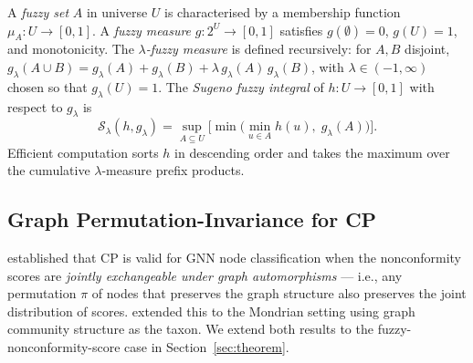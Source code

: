 A \emph{fuzzy set} $A$ in universe $U$ is characterised by a membership
function $\mu_A : U \to [0,1]$.
A \emph{fuzzy measure} $g : 2^U \to [0,1]$ satisfies $g(\emptyset)=0$,
$g(U)=1$, and monotonicity.
The \emph{$\lambda$-fuzzy measure} \citep{sugeno74} is defined recursively:
for $A, B$ disjoint,
$g_\lambda(A \cup B) = g_\lambda(A) + g_\lambda(B) +
\lambda\, g_\lambda(A)\, g_\lambda(B)$,
with $\lambda \in (-1, \infty)$ chosen so that $g_\lambda(U)=1$.
The \emph{Sugeno fuzzy integral} of $h : U \to [0,1]$ with respect to
$g_\lambda$ is
\[
  \mathcal{S}_\lambda(h, g_\lambda)
  = \sup_{A \subseteq U}\bigl[\min\bigl(\min_{u \in A} h(u),\;
    g_\lambda(A)\bigr)\bigr].
\]
Efficient computation sorts $h$ in descending order and takes the maximum
over the cumulative $\lambda$-measure prefix products.

\subsection{Graph Permutation-Invariance for CP}

\citet{cfgnn} established that CP is valid for GNN node classification
when the nonconformity scores are \emph{jointly exchangeable under graph
automorphisms} — i.e., any permutation $\pi$ of nodes that preserves the
graph structure also preserves the joint distribution of scores.
\citet{rrgnn} extended this to the Mondrian setting using graph community
structure as the taxon.
We extend both results to the fuzzy-nonconformity-score case in
Section~\ref{sec:theorem}.
